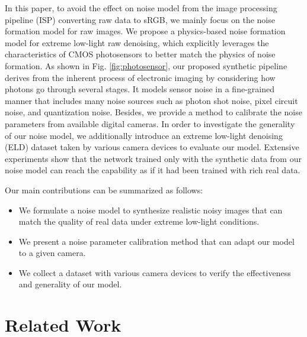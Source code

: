 \documentclass[10pt,twocolumn,letterpaper]{article}
\begin{document}
In this paper, to avoid the effect on noise model from the image processing pipeline (ISP)
\cite{Chen_2018_CVPR,Brooks2018Unprocessing,Mildenhall_2018_CVPR} converting raw data to
sRGB, we mainly focus on the noise formation model for raw images. We
propose a physics-based noise formation model for extreme low-light raw
denoising, which explicitly leverages the characteristics of CMOS photosensors
to better match the physics of noise formation. As shown in Fig.
\ref{fig:photosensor}, our proposed synthetic pipeline derives from the inherent
process of electronic imaging by considering how photons go through several
stages.
It models sensor noise in a fine-grained manner that includes many noise sources such as photon shot noise, pixel circuit noise, and quantization noise.
Besides, we
provide a method to calibrate the noise parameters from available digital
cameras.
In order to investigate the generality of our noise model, we additionally introduce
an extreme low-light denoising (ELD) dataset taken by various camera devices to
evaluate our model. Extensive experiments show that 
the network trained only with the synthetic data from our noise model can reach
the capability as if it had been trained with rich real data.  


Our main contributions can be summarized as follows:
\vspace{-2mm}
\begin{itemize}
	\item We formulate a noise model to synthesize realistic noisy images that can match the quality of real data under extreme low-light conditions.\vspace{-3pt}
	\item We present a noise parameter calibration method that can adapt our model to a given camera.\vspace{-3pt}
	\item We collect a dataset with various camera devices to verify the effectiveness and generality of our model. 
\end{itemize}



\section{Related Work} \label{sec:related-work}
\end{document}
